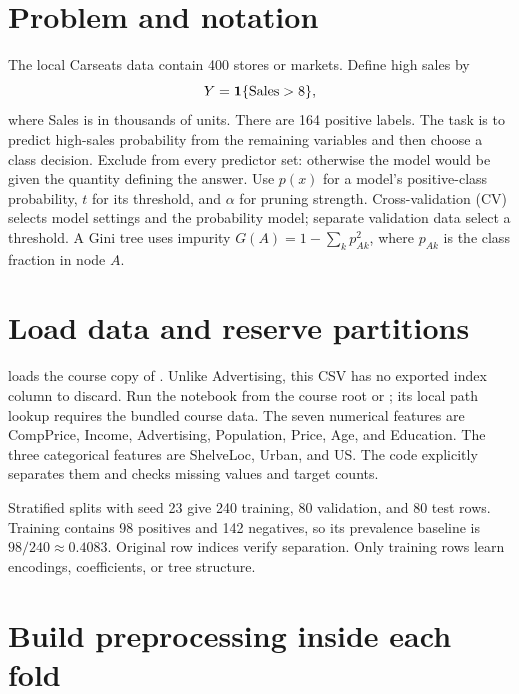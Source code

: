 

\setlength{\parskip}{5pt}

\section*{Problem and notation}
The local Carseats data contain 400 stores or markets. Define high sales by
\[Y=\mathbf{1}\{\mathrm{Sales}>8\},\]
where Sales is in thousands of units. There are 164 positive labels. The task is to predict high-sales probability from the remaining variables and then choose a class decision. Exclude  from every predictor set: otherwise the model would be given the quantity defining the answer.
Use $p(x)$ for a model's positive-class probability, $t$ for its threshold, and $\alpha$ for pruning strength. Cross-validation (CV) selects model settings and the probability model; separate validation data select a threshold. A Gini tree uses impurity $G(A)=1-\sum_k p_{Ak}^2$, where $p_{Ak}$ is the class fraction in node $A$.

\section{Load data and reserve partitions}
 loads the course copy of . Unlike Advertising, this CSV has no exported index column to discard. Run the notebook from the course root or ; its local path lookup requires the bundled course data.
The seven numerical features are CompPrice, Income, Advertising, Population, Price, Age, and Education. The three categorical features are ShelveLoc, Urban, and US. The code explicitly separates them and checks missing values and target counts.

Stratified splits with seed 23 give 240 training, 80 validation, and 80 test rows. Training contains 98 positives and 142 negatives, so its prevalence baseline is $98/240\approx0.4083$. Original row indices verify separation. Only training rows learn encodings, coefficients, or tree structure.

\section{Build preprocessing inside each fold}
